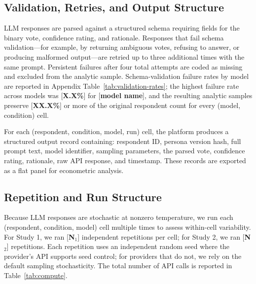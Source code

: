\documentclass[12pt]{article}
\begin{document}
\subsection{Validation, Retries, and Output Structure}\label{sec:methods-validation}

LLM responses are parsed against a structured schema requiring fields for the binary vote, confidence rating, and rationale. Responses that fail schema validation---for example, by returning ambiguous votes, refusing to answer, or producing malformed output---are retried up to three additional times with the same prompt. Persistent failures after four total attempts are coded as missing and excluded from the analytic sample. Schema-validation failure rates by model are reported in Appendix Table~\ref{tab:validation-rates}; the highest failure rate across models was [\textbf{X.X\%}] for [\textbf{model name}], and the resulting analytic samples preserve [\textbf{XX.X\%}] or more of the original respondent count for every (model, condition) cell.

For each (respondent, condition, model, run) cell, the platform produces a structured output record containing: respondent ID, persona version hash, full prompt text, model identifier, sampling parameters, the parsed vote, confidence rating, rationale, raw API response, and timestamp. These records are exported as a flat panel for econometric analysis.

\subsection{Repetition and Run Structure}\label{sec:methods-repetition}

Because LLM responses are stochastic at nonzero temperature, we run each (respondent, condition, model) cell multiple times to assess within-cell variability. For Study 1, we ran [\textbf{N$_1$}] independent repetitions per cell; for Study 2, we ran [\textbf{N$_2$}] repetitions. Each repetition uses an independent random seed where the provider's API supports seed control; for providers that do not, we rely on the default sampling stochasticity. The total number of API calls is reported in Table~\ref{tab:compute}.
\end{document}
